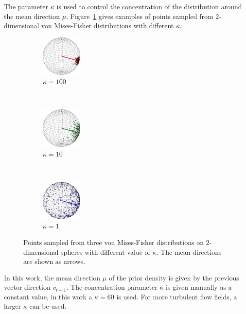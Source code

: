 The parameter $\kappa$ is used to control the concentration of the distribution around the mean direction $\mu$. Figure~\ref{fisher} gives examples of points sampled from 2-dimensional von Mises-Fisher distributions with different $\kappa$.

\begin{figure}[htb]
  \centering
  \begin{subfigure}[b]{0.16\textwidth}
    \centering
    \includegraphics[width=0.8in]{../figures/vf_100.eps}
    \caption{$\kappa=100$}
  \end{subfigure}~
  \begin{subfigure}[b]{0.16\textwidth}
    \centering
    \includegraphics[width=0.8in]{../figures/vf_10.eps}
    \caption{$\kappa=10$}
  \end{subfigure}~
  \begin{subfigure}[b]{0.16\textwidth}
    \centering
    \includegraphics[width=0.8in]{../figures/vf_1.eps}
    \caption{$\kappa=1$}
  \end{subfigure}
  \caption{Points sampled from three von Mises-Fisher distributions on $2$-dimensional spheres with different value of $\kappa$. The mean directions are shown as arrows.}
  \label{fisher}
\end{figure}

In this work, the mean direction $\mu$ of the prior density is given by the previous vector direction ${v_{t - 1}}$. The concentration parameter $\kappa$ is given manually as a constant value, in this work a $\kappa = 60$ is used. For more turbulent flow fields, a larger $\kappa$ can be used.

